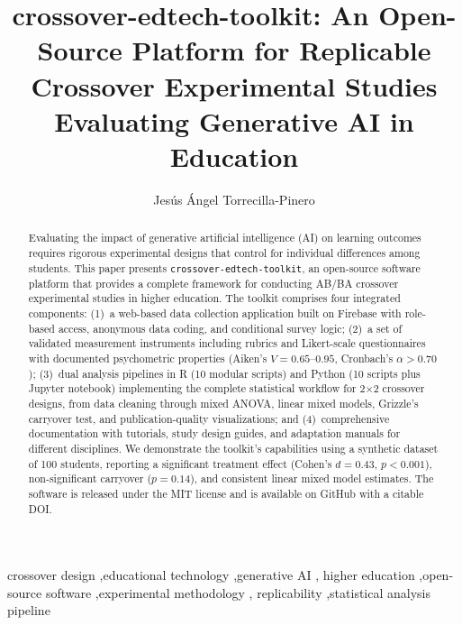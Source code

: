 \documentclass[authoryear,preprint,review,12pt]{elsarticle}
\begin{document}
\begin{frontmatter}

\title{crossover-edtech-toolkit: An Open-Source Platform for Replicable\\
Crossover Experimental Studies Evaluating Generative AI in Education}

\author[uex]{Jes\'us \'Angel Torrecilla-Pinero}


\address[uex]{Department of Construction, Escuela Polit\'ecnica, Universidad de Extremadura, C\'aceres, Spain}

\begin{abstract}
Evaluating the impact of generative artificial intelligence (AI) on learning outcomes
requires rigorous experimental designs that control for individual differences among
students. This paper presents \texttt{crossover-edtech-toolkit}, an open-source
software platform that provides a complete framework for conducting AB/BA crossover
experimental studies in higher education. The toolkit comprises four integrated
components: (1)~a web-based data collection application built on Firebase with
role-based access, anonymous data coding, and conditional survey logic;
(2)~a set of validated measurement instruments including rubrics and Likert-scale
questionnaires with documented psychometric properties (Aiken's $V = 0.65$--$0.95$,
Cronbach's $\alpha > 0.70$);
(3)~dual analysis pipelines in R (10 modular scripts) and Python (10 scripts plus
Jupyter notebook) implementing the complete statistical workflow for 2$\times$2
crossover designs, from data cleaning through mixed ANOVA, linear mixed models,
Grizzle's carryover test, and publication-quality visualizations; and
(4)~comprehensive documentation with tutorials, study design guides, and adaptation
manuals for different disciplines. We demonstrate the toolkit's capabilities using
a synthetic dataset of 100 students, reporting a significant treatment effect
(Cohen's $d = 0.43$, $p < 0.001$), non-significant carryover ($p = 0.14$),
and consistent linear mixed model estimates. The software is released under the
MIT license and is available on GitHub with a citable DOI.
\end{abstract}

\begin{keyword}
crossover design \sep educational technology \sep generative AI \sep
higher education \sep open-source software \sep experimental methodology \sep
replicability \sep statistical analysis pipeline
\end{keyword}

\end{frontmatter}
\end{document}
